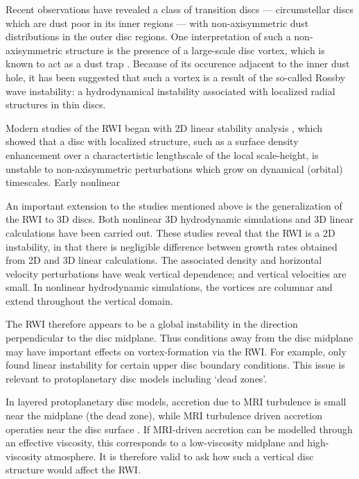 \documentclass[useAMS,usenatbib]{mn2e}
\begin{document}
Recent observations have revealed a class of transition discs ---
circumstellar discs which are dust poor in its inner regions ---  
with non-axisymmetric dust distributions in the outer disc
regions. One %
interpretation of such a non-axisymmetric structure is the presence of
a large-scale disc vortex, which is known to act as a dust trap
\citep{barge95}. Because of its occurence adjacent to the inner dust
hole, it has been suggested that such a vortex is a result of the
so-called Rossby wave instability: a hydrodynamical instability
associated with localized radial structures in thin discs.  


Modern studies of the RWI began with 2D linear stability analysis
\citep{lovelace99,li00}, which showed that a disc with localized
structure, such as a surface density enhancement over a
charactertistic lengthscale of the local scale-height, is unstable to
non-axisymmetric perturbations which grow on dynamical (orbital)
timescales. Early nonlinear 


An important extension to the studies mentioned above is the
generalization of the RWI to 3D 
discs. Both nonlinear 3D hydrodynamic simulations 
\citep{meheut10,meheut12b,lin12b} and 3D linear calculations
\citep{umurhan10,meheut12,lin12,lin13} have been carried out. 
These studies reveal that the RWI is a 2D instability,
in that there is negligible difference between growth rates obtained
from 2D and 3D linear calculations. The associated density and
horizontal velocity perturbations have weak vertical dependence; and
vertical velocities are small. In nonlinear hydrodynamic simulations,
the vortices are columnar and extend throughout the vertical domain. 

The RWI therefore appears to be a global instability in the direction
perpendicular to the disc midplane. Thus conditions away
from the disc midplane may have important effects on vortex-formation
via the RWI. For example, \cite{lin13a} only found linear
instability for certain upper disc boundary conditions. This issue is
relevant to protoplanetary disc models including `dead zones'. 

In layered protoplanetary disc models, accretion due to MRI turbulence
is small near the midplane (the dead zone), while MRI turbulence driven accretion
operaties near the disc surface \citep{gammie96,armitage11}. %
If MRI-driven accretion can be modelled through an effective 
viscosity, this corresponds to a low-viscosity midplane and 
high-viscosity atmosphere. It is therefore valid to ask how such a
vertical disc structure would affect the RWI. 
\end{document}
